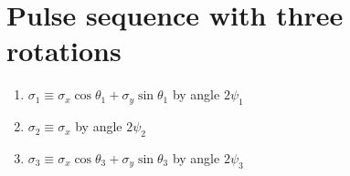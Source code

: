 \documentclass[10pt,fleqn]{article}
\title{}
\begin{document}
\maketitle

\section{Pulse sequence with three rotations}
\begin{enumerate}
\item $\sigma_1\equiv\sigma_x\cos\theta_1+\sigma_y\sin\theta_1$ by angle $2\psi_1$
\item $\sigma_2\equiv\sigma_x$ by angle $2\psi_2$
\item $\sigma_3\equiv\sigma_x\cos\theta_3+\sigma_y\sin\theta_3$ by angle $2\psi_3$
\end{enumerate}
\end{document}
